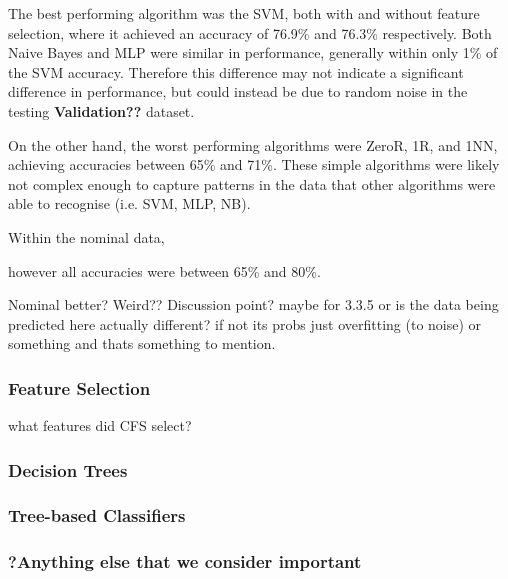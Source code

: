 The best performing algorithm was the SVM, both with and without feature selection, where it achieved an accuracy of 76.9\% and 76.3\% respectively. Both Naive Bayes and MLP were similar in performance, generally within only 1\% of the SVM accuracy. Therefore this difference may not indicate a significant difference in performance, but could instead be due to random noise in the testing \textbf{Validation??} dataset.

On the other hand, the worst performing algorithms were ZeroR, 1R, and 1NN, achieving accuracies between 65\% and 71\%. These simple algorithms were likely not complex enough to capture patterns in the data that other algorithms were able to recognise (i.e. SVM, MLP, NB).


Within the nominal data, 


however all accuracies were between 65\% and 80\%. 

Nominal better? Weird?? Discussion point? maybe for 3.3.5
or is the data being predicted here actually different? if not its probs just overfitting (to noise) or something and thats something to mention.

\subsubsection{Feature Selection}


what features did CFS select?

\subsubsection{Decision Trees}



\subsubsection{Tree-based Classifiers}




\subsubsection{?Anything else that we consider important}

